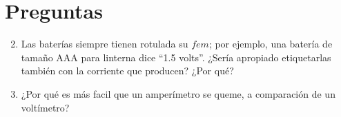 \documentclass[../main.tex]{subfiles}
\begin{document}
\section{Preguntas}%
\label{sec:preguntas}

\thispagestyle{fancy}

\begin{enumerate}
	\setcounter{enumi}{1}
	\item Las baterías siempre tienen rotulada su $fem$; por ejemplo,
		una batería de tamaño AAA para linterna dice ``1.5 volts''.
		¿Sería apropiado etiquetarlas también con la corriente que producen?
		¿Por qué?
	\item ¿Por qué es más facil que un amperímetro se queme,
		a comparación de un voltímetro?
\end{enumerate}
\end{document}
